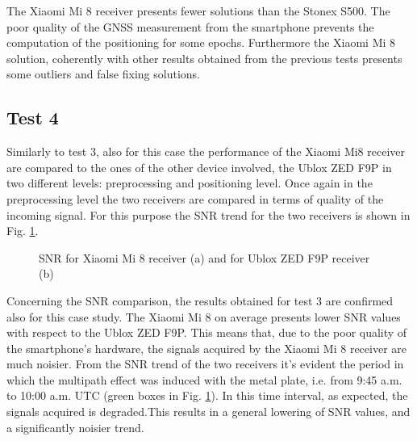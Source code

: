 The Xiaomi Mi 8 receiver presents fewer solutions than the Stonex S500. The poor quality of the GNSS measurement from the smartphone prevents the computation of the positioning for some epochs. Furthermore the Xiaomi Mi 8 solution, coherently with other results obtained from the previous tests presents some outliers and false fixing solutions.


\subsection{Test 4}
Similarly to test 3, also for this case the performance of the Xiaomi Mi8 receiver are compared to the ones of the other device involved, the Ublox ZED F9P in two different levels: preprocessing and positioning level. Once again in the preprocessing level the two receivers are compared in terms of quality of the incoming signal. For this purpose the SNR trend for the two receivers is shown in Fig. \ref{FIG:test4_snr}.
\begin{figure}[H] 
	\centering
    \caption{SNR for Xiaomi Mi 8 receiver (a) and for Ublox ZED F9P receiver (b) }
	\label{FIG:test4_snr} 
\end{figure}

Concerning the SNR comparison, the results obtained for test 3 are confirmed also for this case study. The Xiaomi Mi 8 on average presents lower SNR values with respect to the Ublox ZED F9P. This means that, due to the poor quality of the smartphone's hardware, the signals acquired by the Xiaomi Mi 8 receiver are much noisier. From the SNR trend of the two receivers it's evident the period in which the multipath effect was induced with the metal plate, i.e. from 9:45 a.m. to 10:00 a.m. UTC (green boxes in Fig. \ref{FIG:test4_snr}). In this time interval, as expected, the signals acquired is degraded.This results in a general lowering of SNR values, and a significantly noisier trend. 


